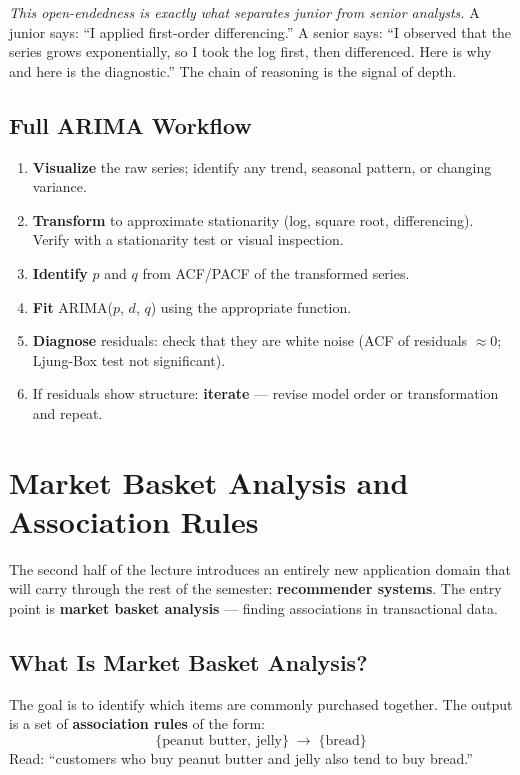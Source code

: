 \documentclass[11pt]{article}
\begin{document}
\textit{This open-endedness is exactly what separates junior from senior
analysts.} A junior says: ``I applied first-order differencing.'' A senior
says: ``I observed that the series grows exponentially, so I took the log
first, then differenced. Here is why and here is the diagnostic.'' The
chain of reasoning is the signal of depth.

\subsection{Full ARIMA Workflow}
\begin{enumerate}
    \item \textbf{Visualize} the raw series; identify any trend, seasonal
      pattern, or changing variance.
    \item \textbf{Transform} to approximate stationarity (log, square root,
      differencing). Verify with a stationarity test or visual inspection.
    \item \textbf{Identify} $p$ and $q$ from ACF/PACF of the transformed
      series.
    \item \textbf{Fit} ARIMA($p$, $d$, $q$) using the appropriate function.
    \item \textbf{Diagnose} residuals: check that they are white noise
      (ACF of residuals $\approx 0$; Ljung-Box test not significant).
    \item If residuals show structure: \textbf{iterate} --- revise model order
      or transformation and repeat.
\end{enumerate}


\section{Market Basket Analysis and Association Rules}

The second half of the lecture introduces an entirely new application domain
that will carry through the rest of the semester: \textbf{recommender systems}.
The entry point is \textbf{market basket analysis} --- finding associations
in transactional data.

\subsection{What Is Market Basket Analysis?}
The goal is to identify which items are commonly purchased together.
The output is a set of \textbf{association rules} of the form:
\[
\{\text{peanut butter},\ \text{jelly}\} \;\longrightarrow\; \{\text{bread}\}
\]
Read: ``customers who buy peanut butter and jelly also tend to buy bread.''
\end{document}
